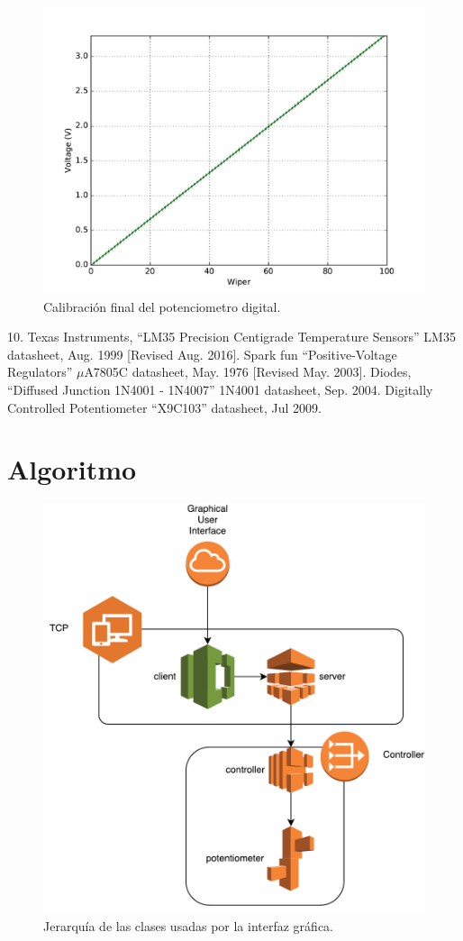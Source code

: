 \documentclass{wileysix}
\begin{document}
\begin{figure}[h]
	\centering
	\includegraphics[width=0.7\linewidth]{extras/final_cal.pdf}
	\caption{Calibraci\'on final del potenciometro digital.}
\end{figure}
\begin{chapreferences}{10.}
	 Texas Instruments, ``LM35 Precision	Centigrade Temperature Sensors'' LM35 datasheet, Aug. 1999 [Revised Aug.
	2016].
	 Spark fun ``Positive-Voltage Regulators'' $\mu$A7805C datasheet, May. 1976 [Revised May. 2003].
	 Diodes, ``Diffused Junction 1N4001 - 1N4007'' 1N4001 datasheet, Sep. 2004.
	Digitally Controlled Potentiometer ``X9C103'' datasheet, Jul 2009.
\end{chapreferences}

\chapter{Algoritmo}
\begin{figure}[h]
	\centering
	\includegraphics[width=0.5\linewidth]{extras/diagram.pdf}
	\caption{Jerarqu\'ia de las clases usadas por la interfaz gr\'afica.}
	\label{fig: diagram}
\end{figure}
\pagebreak
\end{document}
